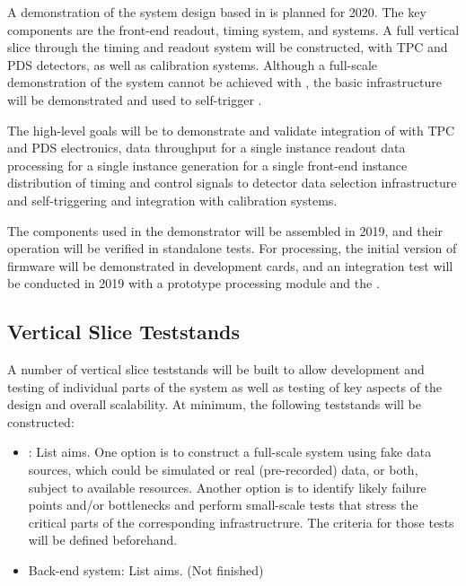 A demonstration of the  system design based in  is
planned for 2020. The key components are the front-end readout, timing
system, and  systems. A full vertical slice through the
timing and readout system will be constructed, with
TPC and PDS detectors, as well as calibration systems. Although a full-scale
demonstration of the  system cannot be achieved with
, the basic infrastructure will be demonstrated and
used to self-trigger .

The high-level goals will be to demonstrate and validate
integration of  with TPC and PDS electronics, 
data throughput for a single  instance 
readout data processing for a single  instance 
 generation for a single front-end instance 
distribution of timing and control signals to detector  
data selection infrastructure and self-triggering  and 
integration with calibration systems.

The components used in the 
demonstrator will be assembled in 2019, and their operation will
be verified in standalone tests. For  processing, the
initial version of firmware will be demonstrated in  development
cards, and an integration test will be conducted in 2019 with a
prototype  processing module and the   .


\subsection{Vertical Slice Teststands}
\label{sec:sp-daq:validation-demonstrators}

A number of vertical slice teststands will be built to allow
development and testing of individual parts of the  system
as well as testing of key aspects of the design and overall scalability. At minimum, the following teststands
will be constructed:
\begin{itemize}
\item {}: List aims. One option is to construct a
  full-scale  system using fake data 
sources, which could be simulated or real (pre-recorded)
 data,
or both, subject to available resources. Another option is to identify
likely failure points and/or bottlenecks and perform
small-scale tests that stress the critical parts of the corresponding
infrastructrure. The criteria for those tests will be defined beforehand.
\item Back-end system: List aims. (Not finished)
\end{itemize}

